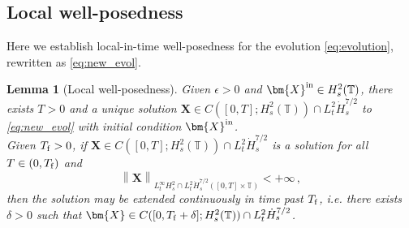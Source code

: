 \documentclass[11pt,reqno]{amsart}
\newcommand{\T}{\mathbb{T}}
\newcommand{\X}{\bm{X}}
\newcommand{\norm}[1]{\left\lVert #1 \right\rVert}
\numberwithin{equation}{section}
\newtheorem{lemma}[theorem]{Lemma}
\theoremstyle{definition}
\begin{document}
\subsection{Local well-posedness}\label{subsec:LWP}
Here we establish local-in-time well-posedness for the evolution \eqref{eq:evolution}, rewritten as \eqref{eq:new_evol}.
%
\begin{lemma}[Local well-posedness]\label{lem:LWP}
Given $\epsilon>0$ and $\X^{\rm in}\in H^2_s(\T)$, there exists $T>0$ and a unique solution $\X\in C([0,T];H^2_s(\T))\cap L^2_t\dot H^{7/2}_s$ to \eqref{eq:new_evol} with initial condition $\X^{\rm in}$.\\
Given $T_{\rm f}>0$, if $\X\in C([0,T];H^2_s(\T))\cap L^2_t\dot H^{7/2}_s$ is a solution for all $T\in (0,T_{\rm f})$ and 
\begin{equation}\label{eq:continuation}
  \norm{\X}_{L^\infty_tH^2_s\cap L^2_t\dot H^{7/2}_s([0,T]\times \T)}<+\infty\,, 
\end{equation} 
then the solution may be extended continuously in time past $T_{\rm f}$, i.e. there exists $\delta>0$ such that $\X\in C([0,T_{\rm f}+\delta];H^2_s(\T))\cap L^2_t\dot H^{7/2}_s$. 
\end{lemma}
\end{document}

